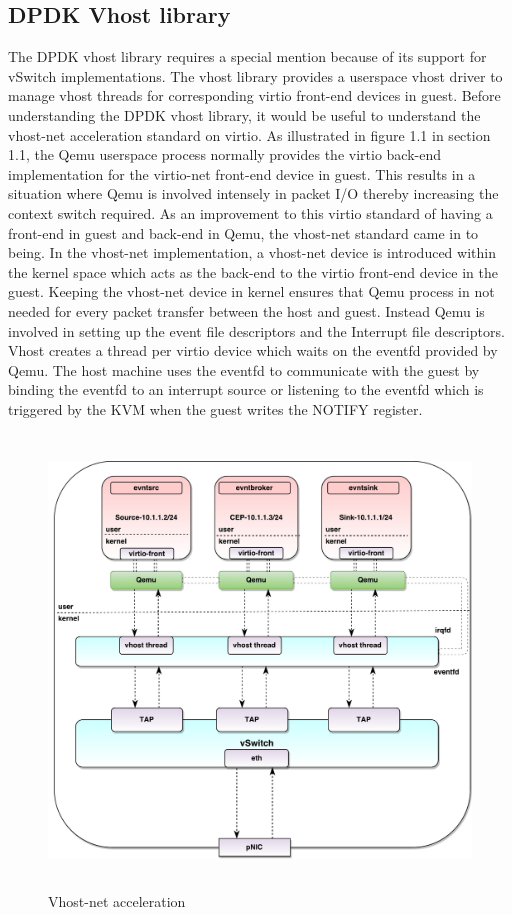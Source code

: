 \subsection{DPDK Vhost library}
The DPDK vhost library requires a special mention because of its support for vSwitch implementations. The vhost library provides a userspace vhost driver to manage vhost threads for corresponding virtio front-end devices in guest. Before understanding the DPDK vhost library, it would be useful to understand the vhost-net acceleration standard on virtio. As illustrated in figure 1.1 in section 1.1, the Qemu userspace process normally provides the virtio back-end implementation for the virtio-net front-end device in guest. This results in a situation where Qemu is involved intensely in packet I/O thereby increasing the context switch required. As an improvement to this virtio standard of having a front-end in guest and back-end in Qemu, the vhost-net standard came in to being. In the vhost-net implementation, a vhost-net device is introduced within the kernel space which acts as the back-end to the virtio front-end device in the guest. Keeping the vhost-net device in kernel ensures that Qemu process in not needed for every packet transfer between the host and guest. Instead Qemu is involved in setting up the event file descriptors and the Interrupt file descriptors. Vhost creates a thread per virtio device which waits on the eventfd provided by Qemu. The host machine uses the eventfd to communicate with the guest by binding the eventfd to an interrupt source or listening to the eventfd which is triggered by the KVM when the guest writes the NOTIFY register. 

 \begin{figure}[H]
	\centering
	\caption{Vhost-net acceleration}
	\includegraphics[height=12cm]{vhostnet.pdf}
\end{figure}

